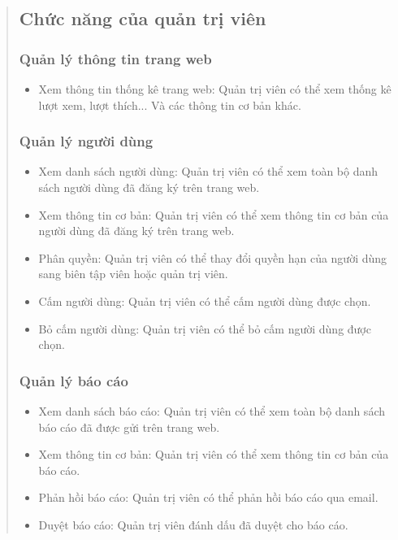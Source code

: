 \begin{quote}
\subsection{Chức năng của quản trị viên} 
\subsubsection{Quản lý thông tin trang web}
\begin{itemize}
    \item Xem thông tin thống kê trang web: Quản trị viên có thể xem thống kê lượt xem, lượt thích... Và các thông tin cơ bản khác.
\end{itemize}
\subsubsection{Quản lý người dùng}
\begin{itemize}
    \item Xem danh sách người dùng: Quản trị viên có thể xem toàn bộ danh sách người dùng đã đăng ký trên trang web.
    \item Xem thông tin cơ bản: Quản trị viên có thể xem thông tin cơ bản của người dùng đã đăng ký trên trang web.
    \item Phân quyền: Quản trị viên có thể thay đổi quyền hạn của người dùng sang biên tập viên hoặc quản trị viên.
    \item Cấm người dùng: Quản trị viên có thể cấm người dùng được chọn.
    \item Bỏ cấm người dùng: Quản trị viên có thể bỏ cấm người dùng được chọn.
\end{itemize}
\subsubsection{Quản lý báo cáo}
\begin{itemize}
    \item Xem danh sách báo cáo: Quản trị viên có thể xem toàn bộ danh sách báo cáo đã được gửi trên trang web.
    \item Xem thông tin cơ bản: Quản trị viên có thể xem thông tin cơ bản của báo cáo.
    \item Phản hồi báo cáo: Quản trị viên có thể phản hồi báo cáo qua email.
    \item Duyệt báo cáo: Quản trị viên đánh dấu đã duyệt cho báo cáo.
\end{itemize}
    
\end{quote}


